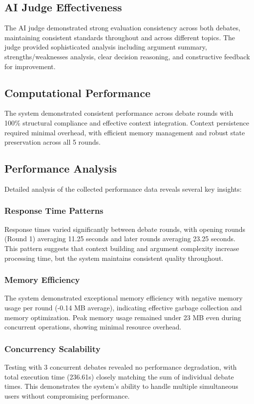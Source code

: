 \documentclass{article}
\begin{document}
\subsection{AI Judge Effectiveness}

The AI judge demonstrated strong evaluation consistency across both debates, maintaining consistent standards throughout and across different topics. The judge provided sophisticated analysis including argument summary, strengths/weaknesses analysis, clear decision reasoning, and constructive feedback for improvement.

\subsection{Computational Performance}

The system demonstrated consistent performance across debate rounds with 100\% structural compliance and effective context integration. Context persistence required minimal overhead, with efficient memory management and robust state preservation across all 5 rounds.

\subsection{Performance Analysis}

Detailed analysis of the collected performance data reveals several key insights:

\subsubsection{Response Time Patterns}
Response times varied significantly between debate rounds, with opening rounds (Round 1) averaging 11.25 seconds and later rounds averaging 23.25 seconds. This pattern suggests that context building and argument complexity increase processing time, but the system maintains consistent quality throughout.

\subsubsection{Memory Efficiency}
The system demonstrated exceptional memory efficiency with negative memory usage per round (-0.14 MB average), indicating effective garbage collection and memory optimization. Peak memory usage remained under 23 MB even during concurrent operations, showing minimal resource overhead.

\subsubsection{Concurrency Scalability}
Testing with 3 concurrent debates revealed no performance degradation, with total execution time (236.61s) closely matching the sum of individual debate times. This demonstrates the system's ability to handle multiple simultaneous users without compromising performance.
\end{document}

